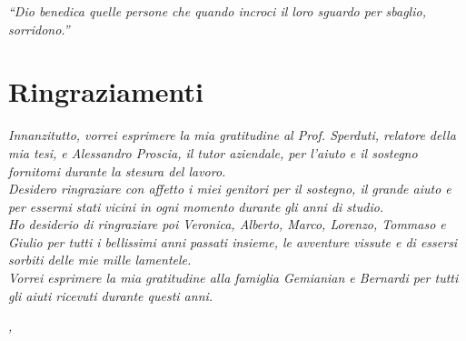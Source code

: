 
\cleardoublepage
{}
{}
\begin{flushright}{
	\slshape
	``Dio benedica quelle persone che quando incroci il loro sguardo per sbaglio, sorridono.''} \\
	\medskip
\end{flushright}


\bigskip

\begingroup
\let\clearpage\relax
\let\cleardoublepage\relax
\let\cleardoublepage\relax

\chapter*{Ringraziamenti}

\noindent \textit{Innanzitutto, vorrei esprimere la mia gratitudine al Prof. Sperduti, relatore della mia tesi, e Alessandro Proscia, il tutor aziendale, per l'aiuto e il sostegno fornitomi durante la stesura del lavoro.}\\

\noindent \textit{Desidero ringraziare con affetto i miei genitori per il sostegno, il grande aiuto e per essermi stati vicini in ogni momento durante gli anni di studio.}\\

\noindent \textit{Ho desiderio di ringraziare poi Veronica, Alberto, Marco, Lorenzo, Tommaso e Giulio per tutti i bellissimi anni passati insieme, le avventure vissute e di essersi sorbiti delle mie mille lamentele.}\\

\noindent \textit{Vorrei esprimere la mia gratitudine alla famiglia Gemianian e Bernardi per tutti gli aiuti ricevuti durante questi anni.}\\
\bigskip

\noindent\textit{\myLocation, \myTime}
\hfill \myName

\endgroup

